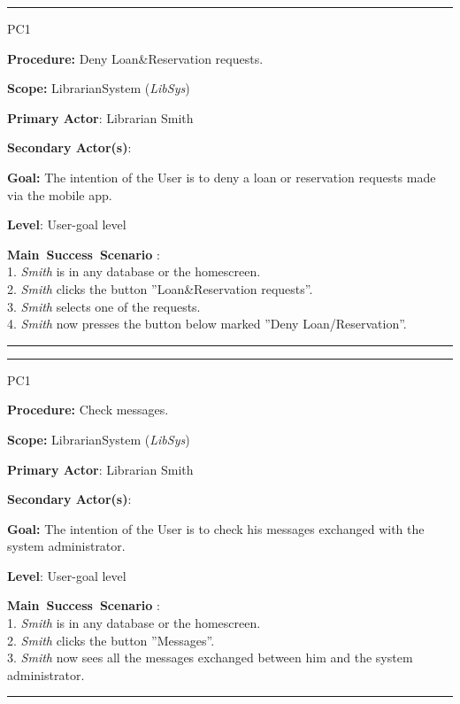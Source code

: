 
\vspace{0.5cm}
\hrule
\begin{lyxlist}{PC1}
\small{
\item [\textbf{Procedure:}] Deny Loan&Reservation requests.
\item [\textbf{Scope:}] LibrarianSystem (\emph{LibSys})
\item [\textbf{Primary Actor}:] Librarian Smith
\item [\textbf{Secondary Actor(s)}:] 
\item [\textbf{Goal:}] The intention of the User is to deny a loan or
reservation requests made via the mobile app.
\item [\textbf{Level}:] User-goal level
\item [\textbf{Main~Success~Scenario}]:\\
1. \emph{Smith} is in any database or the homescreen.\\
2. \emph{Smith} clicks the button ''Loan&Reservation requests''.\\
3. \emph{Smith} selects one of the requests.\\
4. \emph{Smith} now presses the button below marked ''Deny
Loan/Reservation''.\\

}

\end{lyxlist}
\hrule


\vspace{0.5cm}
\hrule
\begin{lyxlist}{PC1}
\small{
\item [\textbf{Procedure:}] Check messages.
\item [\textbf{Scope:}] LibrarianSystem (\emph{LibSys})
\item [\textbf{Primary Actor}:] Librarian Smith
\item [\textbf{Secondary Actor(s)}:] 
\item [\textbf{Goal:}] The intention of the User is to check his messages
exchanged with the system administrator.
\item [\textbf{Level}:] User-goal level
\item [\textbf{Main~Success~Scenario}]:\\
1. \emph{Smith} is in any database or the homescreen.\\
2. \emph{Smith} clicks the button ''Messages''.\\
3. \emph{Smith} now sees all the messages exchanged between him and the
system administrator.\\

}

\end{lyxlist}
\hrule

